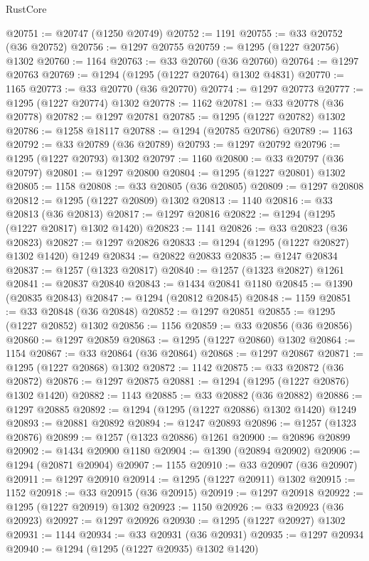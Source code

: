 \begin{lexlean}{RustCore}
\begin{coremodule}
@20751 := @20747 (@1250 @20749)
@20752 := 1191
@20755 := @33 @20752 (@36 @20752)
@20756 := @1297 @20755
@20759 := @1295 (@1227 @20756) @1302
@20760 := 1164
@20763 := @33 @20760 (@36 @20760)
@20764 := @1297 @20763
@20769 := @1294 (@1295 (@1227 @20764) @1302 @4831)
@20770 := 1165
@20773 := @33 @20770 (@36 @20770)
@20774 := @1297 @20773
@20777 := @1295 (@1227 @20774) @1302
@20778 := 1162
@20781 := @33 @20778 (@36 @20778)
@20782 := @1297 @20781
@20785 := @1295 (@1227 @20782) @1302
@20786 := @1258 @18117
@20788 := @1294 (@20785 @20786)
@20789 := 1163
@20792 := @33 @20789 (@36 @20789)
@20793 := @1297 @20792
@20796 := @1295 (@1227 @20793) @1302
@20797 := 1160
@20800 := @33 @20797 (@36 @20797)
@20801 := @1297 @20800
@20804 := @1295 (@1227 @20801) @1302
@20805 := 1158
@20808 := @33 @20805 (@36 @20805)
@20809 := @1297 @20808
@20812 := @1295 (@1227 @20809) @1302
@20813 := 1140
@20816 := @33 @20813 (@36 @20813)
@20817 := @1297 @20816
@20822 := @1294 (@1295 (@1227 @20817) @1302 @1420)
@20823 := 1141
@20826 := @33 @20823 (@36 @20823)
@20827 := @1297 @20826
@20833 := @1294 (@1295 (@1227 @20827) @1302 @1420) @1249
@20834 := @20822 @20833
@20835 := @1247 @20834
@20837 := @1257 (@1323 @20817)
@20840 := @1257 (@1323 @20827) @1261
@20841 := @20837 @20840
@20843 := @1434 @20841 @1180
@20845 := @1390 (@20835 @20843)
@20847 := @1294 (@20812 @20845)
@20848 := 1159
@20851 := @33 @20848 (@36 @20848)
@20852 := @1297 @20851
@20855 := @1295 (@1227 @20852) @1302
@20856 := 1156
@20859 := @33 @20856 (@36 @20856)
@20860 := @1297 @20859
@20863 := @1295 (@1227 @20860) @1302
@20864 := 1154
@20867 := @33 @20864 (@36 @20864)
@20868 := @1297 @20867
@20871 := @1295 (@1227 @20868) @1302
@20872 := 1142
@20875 := @33 @20872 (@36 @20872)
@20876 := @1297 @20875
@20881 := @1294 (@1295 (@1227 @20876) @1302 @1420)
@20882 := 1143
@20885 := @33 @20882 (@36 @20882)
@20886 := @1297 @20885
@20892 := @1294 (@1295 (@1227 @20886) @1302 @1420) @1249
@20893 := @20881 @20892
@20894 := @1247 @20893
@20896 := @1257 (@1323 @20876)
@20899 := @1257 (@1323 @20886) @1261
@20900 := @20896 @20899
@20902 := @1434 @20900 @1180
@20904 := @1390 (@20894 @20902)
@20906 := @1294 (@20871 @20904)
@20907 := 1155
@20910 := @33 @20907 (@36 @20907)
@20911 := @1297 @20910
@20914 := @1295 (@1227 @20911) @1302
@20915 := 1152
@20918 := @33 @20915 (@36 @20915)
@20919 := @1297 @20918
@20922 := @1295 (@1227 @20919) @1302
@20923 := 1150
@20926 := @33 @20923 (@36 @20923)
@20927 := @1297 @20926
@20930 := @1295 (@1227 @20927) @1302
@20931 := 1144
@20934 := @33 @20931 (@36 @20931)
@20935 := @1297 @20934
@20940 := @1294 (@1295 (@1227 @20935) @1302 @1420)

\end{coremodule}
\end{lexlean}
